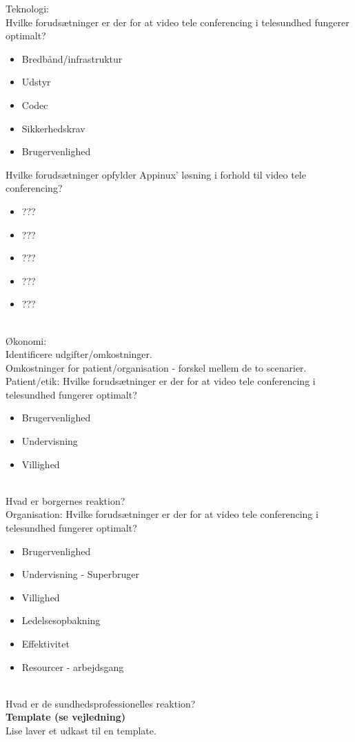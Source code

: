 Teknologi: \\
Hvilke forudsætninger er der for at video tele conferencing i telesundhed fungerer optimalt?\\
\begin{itemize}
	\item Bredbånd/infrastruktur
	\item Udstyr
	\item Codec
	\item Sikkerhedskrav
	\item Brugervenlighed
\end{itemize}

Hvilke forudsætninger opfylder Appinux' løsning i forhold til video tele conferencing?
\begin{itemize}
	\item ???
	\item ???
	\item ???
	\item ???
	\item ???
\end{itemize}
\\

Økonomi: \\
Identificere udgifter/omkostninger.\\
Omkostninger for patient/organisation - forskel mellem de to scenarier.
\\

Patient/etik:
Hvilke forudsætninger er der for at video tele conferencing i  telesundhed fungerer optimalt?\\
\begin{itemize}
	\item Brugervenlighed
	\item Undervisning
	\item Villighed
\end{itemize}
\\
Hvad er borgernes reaktion?\\

Organisation:
Hvilke forudsætninger er der for at video tele conferencing i  telesundhed fungerer optimalt?\\
\begin{itemize}
	\item Brugervenlighed
	\item Undervisning - Superbruger
	\item Villighed
	\item Ledelsesopbakning
	\item Effektivitet
	\item Resourcer - arbejdsgang
\end{itemize}
\\
Hvad er de sundhedsprofessionelles reaktion?\\

\textbf{Template (se vejledning)}
\\
Lise laver et udkast til en template.
